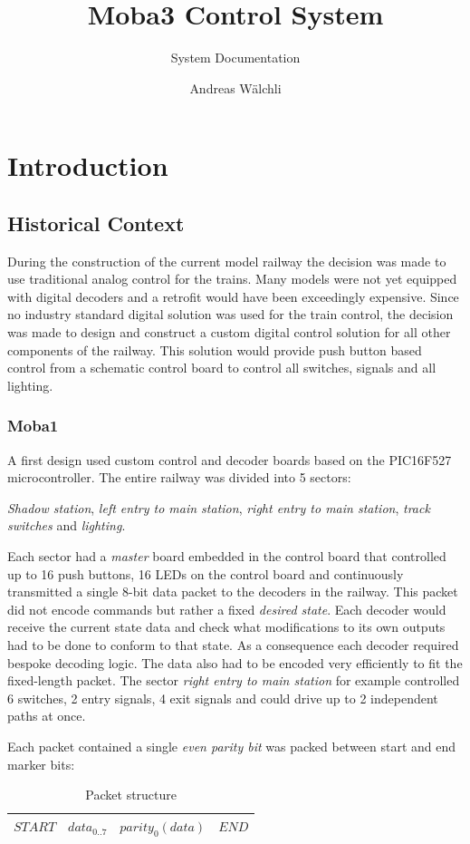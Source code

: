 \documentclass{scrreprt}
\title{Moba3 Control System}
\subtitle{System Documentation}
\author{Andreas Wälchli}
\begin{document}
\maketitle

\tableofcontents{}

\chapter{Introduction}
\section{Historical Context}
During the construction of the current model railway the decision was made to use traditional analog control for the trains.
Many models were not yet equipped with digital decoders and a retrofit would have been exceedingly expensive.
Since no industry standard digital solution was used for the train control, the decision was made to design and construct a custom digital control solution for all other components of the railway.
This solution would provide push button based control from a schematic control board to control all switches, signals and all lighting.

\subsection{Moba1}
A first design used custom control and decoder boards based on the PIC16F527 microcontroller.
The entire railway was divided into 5 sectors:

\emph{Shadow station}, \emph{left entry to main station}, \emph{right entry to main station}, \emph{track switches} and \emph{lighting}.

Each sector had a \emph{master} board embedded in the control board that controlled up to 16 push buttons, 16 LEDs on the control board and continuously transmitted a single 8-bit data packet to the decoders in the railway.
This packet did not encode commands but rather a fixed \emph{desired state}.
Each decoder would receive the current state data and check what modifications to its own outputs had to be done to conform to that state.
As a consequence each decoder required bespoke decoding logic.
The data also had to be encoded very efficiently to fit the fixed-length packet.
The sector \emph{right entry to main station} for example controlled 6 switches, 2 entry signals, 4 exit signals and could drive up to 2 independent paths at once.

Each packet contained a single \emph{even parity bit} was packed between start and end marker bits:
\begin{table}[h!]
\centering
\begin{tabular}{ | c | c | c | c | }
\hline
$START$ & $data_{0..7}$ & $parity_0(data)$ & $END$ \\\hline
\end{tabular}
\caption{Packet structure}
\end{table}
\end{document}
